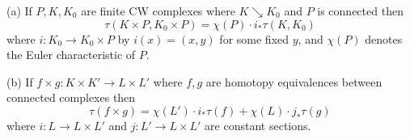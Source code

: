 (a) If $P, K, K_0$ are finite CW complexes where $K \searrow K_0$ and $P$ is connected then
$$\tau(K \times P, K_0 \times P) = \chi(P) \cdot i_* \tau(K, K_0)$$
where $i: K_0 \rightarrow K_0 \times P$ by $i(x) = (x, y)$ for some fixed $y$, and $\chi(P)$ denotes the Euler characteristic of $P$.

(b) If $f \times g: K \times K' \rightarrow L \times L'$ where $f, g$ are homotopy equivalences between connected complexes then
$$\tau(f \times g) = \chi(L') \cdot i_* \tau(f) + \chi(L) \cdot j_* \tau(g)$$
where $i: L \rightarrow L \times L'$ and $j: L' \rightarrow L \times L'$ are constant sections.
